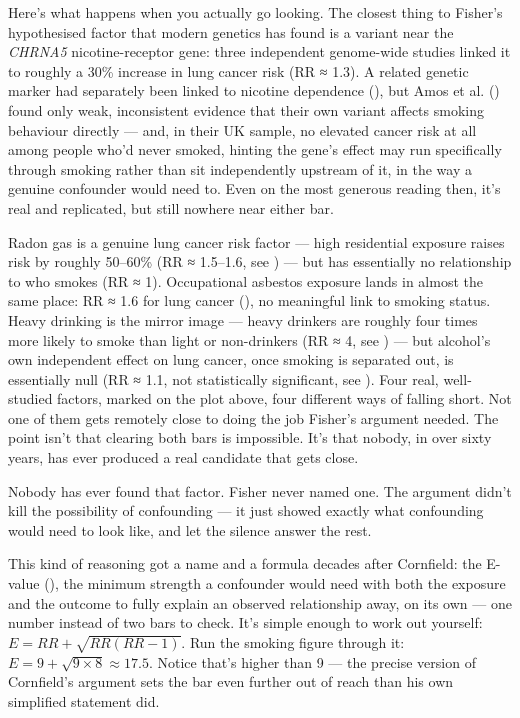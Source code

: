 \documentclass[
]{book}
\begin{document}
Here's what happens when you actually go looking. The closest thing to Fisher's hypothesised factor that modern genetics has found is a variant near the \emph{CHRNA5} nicotine-receptor gene: three independent genome-wide studies linked it to roughly a 30\% increase in lung cancer risk (RR ≈ 1.3). A related genetic marker had separately been linked to nicotine dependence (), but Amos et al. () found only weak, inconsistent evidence that their own variant affects smoking behaviour directly --- and, in their UK sample, no elevated cancer risk at all among people who'd never smoked, hinting the gene's effect may run specifically through smoking rather than sit independently upstream of it, in the way a genuine confounder would need to. Even on the most generous reading then, it's real and replicated, but still nowhere near either bar.

Radon gas is a genuine lung cancer risk factor --- high residential exposure raises risk by roughly 50--60\% (RR ≈ 1.5--1.6, see ) --- but has essentially no relationship to who smokes (RR ≈ 1). Occupational asbestos exposure lands in almost the same place: RR ≈ 1.6 for lung cancer (), no meaningful link to smoking status. Heavy drinking is the mirror image --- heavy drinkers are roughly four times more likely to smoke than light or non-drinkers (RR ≈ 4, see ) --- but alcohol's own independent effect on lung cancer, once smoking is separated out, is essentially null (RR ≈ 1.1, not statistically significant, see ). Four real, well-studied factors, marked on the plot above, four different ways of falling short. Not one of them gets remotely close to doing the job Fisher's argument needed. The point isn't that clearing both bars is impossible. It's that nobody, in over sixty years, has ever produced a real candidate that gets close.

Nobody has ever found that factor. Fisher never named one. The argument didn't kill the possibility of confounding --- it just showed exactly what confounding would need to look like, and let the silence answer the rest.

This kind of reasoning got a name and a formula decades after Cornfield: the E-value (), the minimum strength a confounder would need with both the exposure and the outcome to fully explain an observed relationship away, on its own --- one number instead of two bars to check. It's simple enough to work out yourself: \(E = RR + \sqrt{RR(RR-1)}\). Run the smoking figure through it: \(E = 9 + \sqrt{9 \times 8} \approx 17.5\). Notice that's higher than 9 --- the precise version of Cornfield's argument sets the bar even further out of reach than his own simplified statement did.
\end{document}
